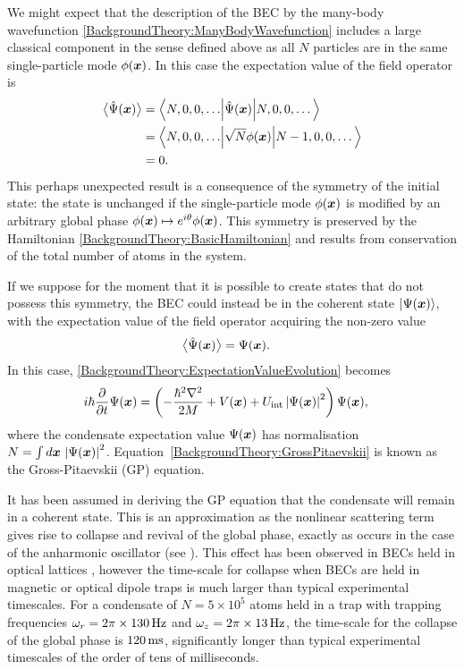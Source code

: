 We might expect that the description of the BEC by the many-body wavefunction \eqref{BackgroundTheory:ManyBodyWavefunction} includes a large classical component in the sense defined above as all $N$ particles are in the same single-particle mode $\phi(\bm{x})$.  In this case the expectation value of the field operator is
\begin{align}
    \mean{\hat{\Psi}(\vect{x})} &= \left<N, 0, 0, \dots \middle| \hat{\Psi}(\vect{x}) \middle| N, 0, 0, \dots \right> \notag \\
    &= \left<N, 0, 0, \dots \middle| \sqrt{N} \phi(\vect{x}) \middle| N - 1, 0, 0, \dots \right> \notag \\
    &= 0. \label{BackgroundTheory:OperatorExpectationValueNumberState}
\end{align}
This perhaps unexpected result is a consequence of the symmetry of the initial state: the state is unchanged if the single-particle mode $\phi(\bm{x})$ is modified by an arbitrary global phase $\phi(\bm{x}) \mapsto e^{i \theta}\phi(\bm{x})$.  This symmetry is preserved by the Hamiltonian \eqref{BackgroundTheory:BasicHamiltonian} and results from conservation of the total number of atoms in the system.

If we suppose for the moment that it is possible to create states that do not possess this symmetry, the BEC could instead be in the coherent state ${\left|\Psi(\bm{x})\right>}$, with the expectation value of the field operator acquiring the non-zero value
\begin{align}
    \mean{\hat{\Psi}(\vect{x})} &= \Psi(\vect{x}). \label{BackgroundTheory:NonZeroMeanField}
\end{align}
In this case, \eqref{BackgroundTheory:ExpectationValueEvolution} becomes
\begin{align}
    i \hbar \frac{\partial}{\partial t} \Psi(\vect{x}) &= \left(- \frac{\hbar^2 \nabla^2}{2 M} + V(\vect{x}) + U_\text{int} \abs{\Psi(\vect{x})}^2 \right) \Psi(\vect{x}), \label{BackgroundTheory:GrossPitaevskii}
\end{align}
where the condensate expectation value $\Psi(\bm{x})$ has normalisation $N = \int d \bm{x}\, \left|\Psi(\bm{x})\right|^2$.  Equation~\eqref{BackgroundTheory:GrossPitaevskii} is known as the Gross-Pitaevskii (GP) equation.  

It has been assumed in deriving the GP equation that the condensate will remain in a coherent state.  This is an approximation as the nonlinear scattering term gives rise to collapse and revival of the global phase, exactly as occurs in the case of the anharmonic oscillator (see ).  This effect has been observed in BECs held in optical lattices \citep{Greiner:2002fk}, however the time-scale for collapse when BECs are held in magnetic or optical dipole traps is much larger than typical experimental timescales.  For a  condensate of $N= 5 \times 10^5$ atoms held in a trap with trapping frequencies $\omega_r = 2\pi\times\unit[130]{Hz}$ and $\omega_z = 2\pi \times \unit[13]{Hz}$, the time-scale for the collapse of the global phase is $\unit[120]{ms}$, significantly longer than typical experimental timescales of the order of tens of milliseconds.

